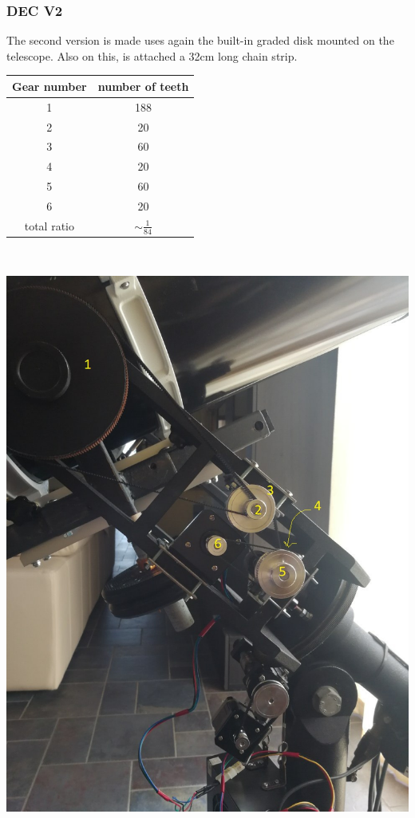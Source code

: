\documentclass{article}
\begin{document}
\begin{multicols}{2}
        \subsubsection{DEC V2}
        The second version is made uses again the built-in graded disk mounted on the telescope.
        Also on this, is attached a 32cm long chain strip.
        
        
        \begin{minipage}
            {0.5\textwidth}
            \centering
            \begin{tabular}{cc}
                Gear number & number of teeth \\
                \hline
                1 & 188 \\
                2 & 20 \\
                3 & 60 \\
                4 & 20 \\
                5 & 60 \\
                6 & 20 \\
                \hline
                total ratio & \(\sim \frac{1}{84}\)
            \end{tabular}
            \label{tab:DEC_gear_spec_v2}
        \end{minipage}
        \\
        \begin{minipage}
            {0.5\textwidth}
            \centering
            \includegraphics[scale=.19]{DEC_v2.jpg}

\end{minipage}
\end{multicols}
\end{document}
